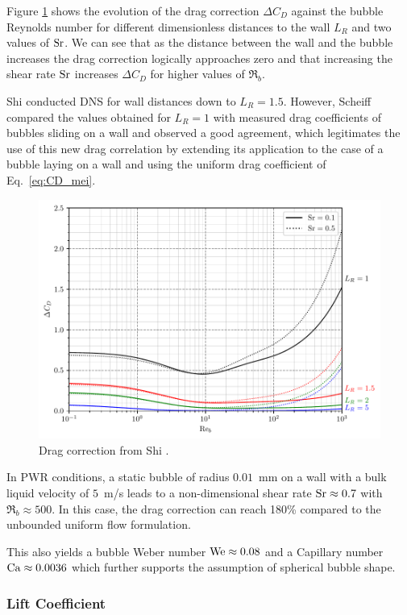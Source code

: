 Figure \ref{fig:CD_shi} shows the evolution of the drag correction $\Delta C_{D}$ against the bubble Reynolds number for different dimensionless distances to the wall $L_{R}$ and two values of $\mathrm{Sr}$.  We can see that as the distance between the wall and the bubble increases the drag correction logically approaches zero and that increasing the shear rate $\mathrm{Sr}$ increases $\Delta C_{D}$ for higher values of $\Re_{b}$.

\npar

Shi \etal \cite{shi_drag_2021} conducted DNS for wall distances down to $L_{R}=1.5$. However, Scheiff \etal \cite{scheiff_experimental_2021} compared the values obtained for $L_{R}=1$  with measured drag coefficients of bubbles sliding on a wall and observed a good agreement, which legitimates the use of this new drag correlation by extending its application to the case of a bubble laying on a wall and using the uniform drag coefficient of Eq.~\ref{eq:CD_mei}.


\begin{figure}[h!]
\centering
\includegraphics[width=0.6\linewidth]{img/bub_dyn/forces/corr_drag.pdf}
\caption{Drag correction from Shi \etal \cite{shi_drag_2021}.}
\label{fig:CD_shi}
\end{figure}


\begin{remark*}{}
In PWR conditions, a static bubble of radius $0.01$\ mm on a wall with a bulk liquid velocity of $5$\ m/s leads to a non-dimensional shear rate $\mathrm{Sr} \approx 0.7$ with $\Re_{b} \approx 500$. In this case, the drag correction can reach 180\% compared to the unbounded uniform flow formulation.

\npar

This also yields a bubble Weber number $\mathrm{We} \approx 0.08$ and a Capillary number $\mathrm{Ca} \approx 0.0036$ which further supports the assumption of spherical bubble shape.
\end{remark*}


\subsubsection{Lift Coefficient}


